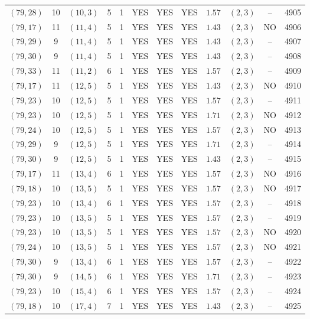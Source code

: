 \begin{longtable}{|c|c|c|c|c|c|c|c|c|c|c|c|}
$(79,28)$ & 10 & $(10,3)$ & 5 & 1 & YES & YES & YES & $1.57$ & $(2,3)$ & -- & 4905\\
$(79,17)$ & 11 & $(11,4)$ & 5 & 1 & YES & YES & YES & $1.43$ & $(2,3)$ & NO & 4906\\
$(79,29)$ & 9 & $(11,4)$ & 5 & 1 & YES & YES & YES & $1.43$ & $(2,3)$ & -- & 4907\\
$(79,30)$ & 9 & $(11,4)$ & 5 & 1 & YES & YES & YES & $1.43$ & $(2,3)$ & -- & 4908\\
$(79,33)$ & 11 & $(11,2)$ & 6 & 1 & YES & YES & YES & $1.57$ & $(2,3)$ & -- & 4909\\
$(79,17)$ & 11 & $(12,5)$ & 5 & 1 & YES & YES & YES & $1.43$ & $(2,3)$ & NO & 4910\\
$(79,23)$ & 10 & $(12,5)$ & 5 & 1 & YES & YES & YES & $1.57$ & $(2,3)$ & -- & 4911\\
$(79,23)$ & 10 & $(12,5)$ & 5 & 1 & YES & YES & YES & $1.71$ & $(2,3)$ & NO & 4912\\
$(79,24)$ & 10 & $(12,5)$ & 5 & 1 & YES & YES & YES & $1.57$ & $(2,3)$ & NO & 4913\\
$(79,29)$ & 9 & $(12,5)$ & 5 & 1 & YES & YES & YES & $1.71$ & $(2,3)$ & -- & 4914\\
$(79,30)$ & 9 & $(12,5)$ & 5 & 1 & YES & YES & YES & $1.43$ & $(2,3)$ & -- & 4915\\
$(79,17)$ & 11 & $(13,4)$ & 6 & 1 & YES & YES & YES & $1.57$ & $(2,3)$ & NO & 4916\\
$(79,18)$ & 10 & $(13,5)$ & 5 & 1 & YES & YES & YES & $1.57$ & $(2,3)$ & NO & 4917\\
$(79,23)$ & 10 & $(13,4)$ & 6 & 1 & YES & YES & YES & $1.57$ & $(2,3)$ & -- & 4918\\
$(79,23)$ & 10 & $(13,5)$ & 5 & 1 & YES & YES & YES & $1.57$ & $(2,3)$ & -- & 4919\\
$(79,23)$ & 10 & $(13,5)$ & 5 & 1 & YES & YES & YES & $1.57$ & $(2,3)$ & NO & 4920\\
$(79,24)$ & 10 & $(13,5)$ & 5 & 1 & YES & YES & YES & $1.57$ & $(2,3)$ & NO & 4921\\
$(79,30)$ & 9 & $(13,4)$ & 6 & 1 & YES & YES & YES & $1.57$ & $(2,3)$ & -- & 4922\\
$(79,30)$ & 9 & $(14,5)$ & 6 & 1 & YES & YES & YES & $1.71$ & $(2,3)$ & -- & 4923\\
$(79,23)$ & 10 & $(15,4)$ & 6 & 1 & YES & YES & YES & $1.57$ & $(2,3)$ & -- & 4924\\
$(79,18)$ & 10 & $(17,4)$ & 7 & 1 & YES & YES & YES & $1.43$ & $(2,3)$ & -- & 4925\\

\end{longtable}
